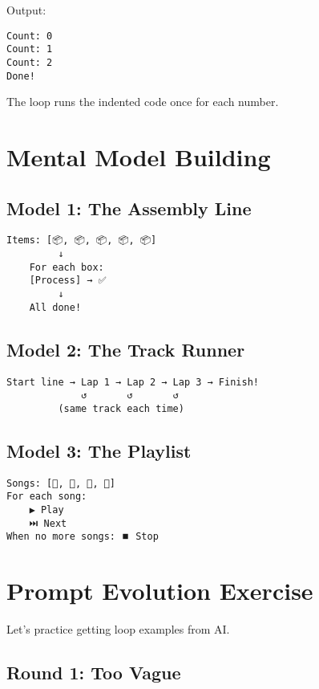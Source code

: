 \documentclass[
  letterpaper,
  DIV=11,
  numbers=noendperiod,
  oneside]{scrreprt}
\begin{document}
Output:

\begin{verbatim}
Count: 0
Count: 1  
Count: 2
Done!
\end{verbatim}

The loop runs the indented code once for each number.

\section{Mental Model Building}\label{mental-model-building-4}

\subsection{Model 1: The Assembly Line}\label{model-1-the-assembly-line}

\begin{verbatim}
Items: [📦, 📦, 📦, 📦, 📦]
         ↓
    For each box:
    [Process] → ✅
         ↓
    All done!
\end{verbatim}

\subsection{Model 2: The Track Runner}\label{model-2-the-track-runner}

\begin{verbatim}
Start line → Lap 1 → Lap 2 → Lap 3 → Finish!
             ↺       ↺       ↺
         (same track each time)
\end{verbatim}

\subsection{Model 3: The Playlist}\label{model-3-the-playlist}

\begin{verbatim}
Songs: [🎵, 🎵, 🎵, 🎵]
For each song:
    ▶️ Play
    ⏭️ Next
When no more songs: ⏹️ Stop
\end{verbatim}

\section{Prompt Evolution Exercise}\label{prompt-evolution-exercise-4}

Let's practice getting loop examples from AI.

\subsection{Round 1: Too Vague}\label{round-1-too-vague-4}
\end{document}
